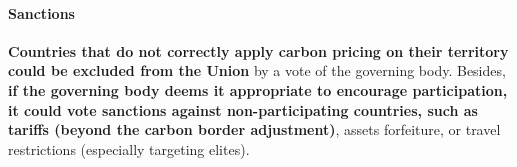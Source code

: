 \documentclass[12pt,english]{article}
\begin{document}

\paragraph{Sanctions}

\textbf{Countries that do not correctly apply carbon pricing on their territory could be excluded from the Union} by a vote of the governing body. 
Besides, \textbf{if the governing body deems it appropriate to encourage participation, it could vote sanctions against non-participating countries, such as tariffs (beyond the carbon border adjustment)}, assets forfeiture, or travel restrictions (especially targeting elites). 
\end{document}
